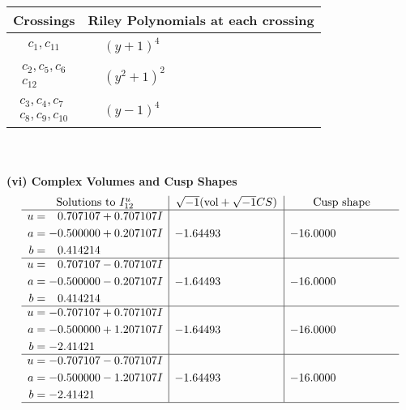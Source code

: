 \documentclass[1p]{elsarticle_modified}
\theoremstyle{definition}
\newcommand{\I}{\sqrt{-1}}
\begin{document}
\begin{tabular}{m{50pt}|m{274pt}}
Crossings & \hspace{64pt}Riley Polynomials at each crossing \\
\hline $$\begin{aligned}c_{1},c_{11}\end{aligned}$$&$\begin{aligned}
&(y+1)^4
\end{aligned}$\\
\hline $$\begin{aligned}c_{2},c_{5},c_{6}\\c_{12}\end{aligned}$$&$\begin{aligned}
&(y^2+1)^2
\end{aligned}$\\
\hline $$\begin{aligned}c_{3},c_{4},c_{7}\\c_{8},c_{9},c_{10}\end{aligned}$$&$\begin{aligned}
&(y-1)^4
\end{aligned}$\\
\hline
\end{tabular}\\~\\
\newpage\flushleft \textbf{(vi) Complex Volumes and Cusp Shapes}
$$\begin{array}{c|c|c}  
\text{Solutions to }I^u_{12}& \I (\text{vol} + \sqrt{-1}CS) & \text{Cusp shape}\\
 \hline 
\begin{aligned}
u &= \phantom{-}0.707107 + 0.707107 I \\
a &= -0.500000 + 0.207107 I \\
b &= \phantom{-}0.414214\phantom{ +0.000000I}\end{aligned}
 & -1.64493\phantom{ +0.000000I} & -16.0000\phantom{ +0.000000I} \\ \hline\begin{aligned}
u &= \phantom{-}0.707107 - 0.707107 I \\
a &= -0.500000 - 0.207107 I \\
b &= \phantom{-}0.414214\phantom{ +0.000000I}\end{aligned}
 & -1.64493\phantom{ +0.000000I} & -16.0000\phantom{ +0.000000I} \\ \hline\begin{aligned}
u &= -0.707107 + 0.707107 I \\
a &= -0.500000 + 1.207107 I \\
b &= -2.41421\phantom{ +0.000000I}\end{aligned}
 & -1.64493\phantom{ +0.000000I} & -16.0000\phantom{ +0.000000I} \\ \hline\begin{aligned}
u &= -0.707107 - 0.707107 I \\
a &= -0.500000 - 1.207107 I \\
b &= -2.41421\phantom{ +0.000000I}\end{aligned}
 & -1.64493\phantom{ +0.000000I} & -16.0000\phantom{ +0.000000I}\\
 \hline 
 \end{array}$$\newpage\newpage\renewcommand{\arraystretch}{1}
\end{document}
